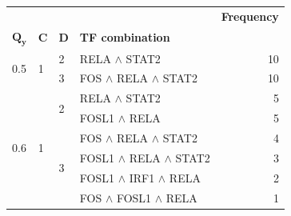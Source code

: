 \begin{tabular}{llllr}
\toprule
 &  &  &  & \textbf{Frequency} \\
$\mathbf{Q_y}$ & $\mathbf{C}$ & $\mathbf{D}$ & \textbf{TF combination} &  \\
\midrule
\multirow[t]{2}{*}{0.5} & \multirow[t]{2}{*}{1} & 2 & {RELA $\wedge$ STAT2} & 10 \\
\cline{3-5}
 &  & 3 & {FOS $\wedge$ RELA $\wedge$ STAT2} & 10 \\
\cline{1-5} \cline{2-5} \cline{3-5}
\multirow[t]{6}{*}{0.6} & \multirow[t]{6}{*}{1} & \multirow[t]{2}{*}{2} & {RELA $\wedge$ STAT2} & 5 \\
 &  &  & {FOSL1 $\wedge$ RELA} & 5 \\
\cline{3-5}
 &  & \multirow[t]{4}{*}{3} & {FOS $\wedge$ RELA $\wedge$ STAT2} & 4 \\
 &  &  & {FOSL1 $\wedge$ RELA $\wedge$ STAT2} & 3 \\
 &  &  & {FOSL1 $\wedge$ IRF1 $\wedge$ RELA} & 2 \\
 &  &  & {FOS $\wedge$ FOSL1 $\wedge$ RELA} & 1 \\
\cline{1-5} \cline{2-5} \cline{3-5}
\bottomrule
\end{tabular}
